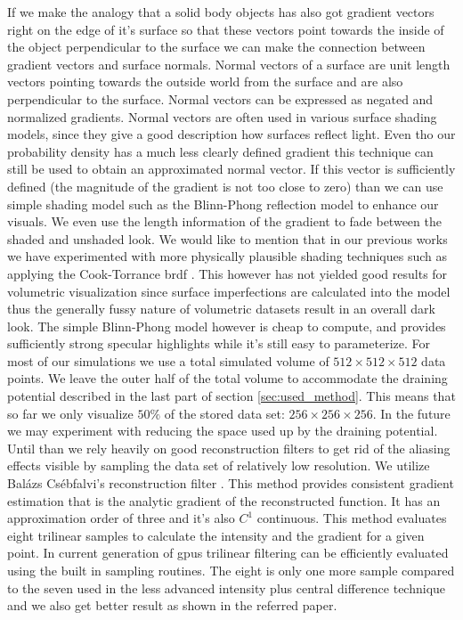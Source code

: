If we make the analogy that a solid body objects has also got gradient vectors right on the edge of it's surface so that these vectors point towards the inside of the object perpendicular to the surface
we can make the connection between gradient vectors and surface normals.
Normal vectors of a surface are unit length vectors pointing towards the outside world from the surface and are also perpendicular to the surface.
Normal vectors can be expressed as negated and normalized gradients.
Normal vectors are often used in various surface shading models, since they give a good description how surfaces reflect light.
Even tho our probability density has a much less clearly defined gradient this technique can still be used to obtain an approximated normal vector.
If this vector is sufficiently defined (the magnitude of the gradient is not too close to zero) than we can use simple shading model such as the Blinn-Phong reflection model \cite{Blinn1977} to enhance our visuals.
We even use the length information of the gradient to fade between the shaded and unshaded look.
We would like to mention that in our previous works we have experimented with more physically plausible shading techniques such as applying the Cook-Torrance \acrfull{brdf} \cite{CookTorrance1982}.
This however has not yielded good results for volumetric visualization since surface imperfections are calculated into the model thus the generally fussy nature of volumetric datasets result in an overall dark look.
The simple Blinn-Phong model however is cheap to compute, and provides sufficiently strong specular highlights while it's still easy to parameterize.
For most of our simulations we use a total simulated volume of $512\times 512 \times 512$ data points.
We leave the outer half of the total volume to accommodate the draining potential described in the last part of section \ref{sec:used_method}.
This means that so far we only visualize $50\%$ of the stored data set: $256 \times 256 \times 256$.
In the future we may experiment with reducing the space used up by the draining potential.
Until than we rely heavily on good reconstruction filters to get rid of the aliasing effects visible by sampling the data set of relatively low resolution.
We utilize Balázs Csébfalvi's reconstruction filter \cite{csebfalvi2023}.
This method provides consistent gradient estimation that is the analytic gradient of the reconstructed function.
It has an approximation order of three and it's also $C^1$ continuous.
This method evaluates eight trilinear samples to calculate the intensity and the gradient for a given point.
In current generation of \acrshort{gpu}s trilinear filtering can be efficiently evaluated using the built in sampling routines.
The eight is only one more sample compared to the seven used in the less advanced intensity plus central difference technique and we also get better result as shown in the referred paper.


